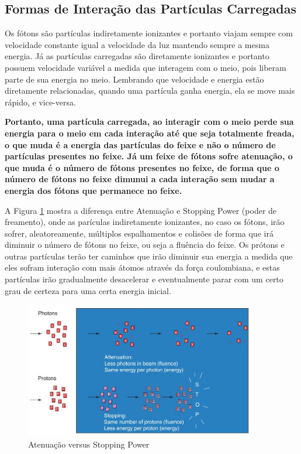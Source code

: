 \documentclass[11pt,a4paper]{article}
\begin{document}
        \subsection{Formas de Interação das Partículas Carregadas}

            
            Os fótons são partículas indiretamente ionizantes e portanto viajam sempre com velocidade constante igual a velocidade da luz mantendo sempre a mesma energia. Já as partículas carregadas são diretamente ionizantes e portanto possuem velocidade variável a medida que interagem com o meio, pois liberam parte de sua energia no meio. Lembrando que velocidade e energia estão diretamente relacionadas, quando uma partícula ganha energia, ela se move mais rápido, e vice-versa.

            \textbf{\textcolor{CarnationPink}{Portanto, uma partícula carregada, ao interagir com o meio perde sua energia para o meio em cada interação até que seja totalmente freada, o que muda é a energia das partículas do feixe e não o número de partículas presentes no feixe. Já um feixe de fótons sofre atenuação, o que muda é o número de fótons presentes no feixe, de forma que o número de fótons no feixe dimunui a cada interação sem mudar a energia dos fótons que permanece no feixe.}}


            A Figura \ref{fig:atenuacaoVsStoppingPower} mostra a diferença entre Atenuação e Stopping Power (poder de freamento), onde as parículas indiretamente ionizantes, no caso os fótons, irão sofrer, aleatoreamente, múltiplos espalhamentos e colisões de forma que irá diminuir o número de fótons no feixe, ou seja a fluência do feixe. Os prótons e outras partículas terão ter caminhos que irão diminuir sua energia a medida que eles sofram interação com mais átomos através da força coulombiana, e estas partículas irão gradualmente desacelerar e eventualmente parar com um certo grau de certeza para uma certa energia inicial.

        
            \begin{figure}[h]
                \centering
                \includegraphics[width=0.9\textwidth]{Imagens/atenuacaoVsStoppingPower.JPG}
                \caption{Atenuação versus Stopping Power}
                \label{fig:atenuacaoVsStoppingPower}                
            \end{figure}
            
\end{document}

